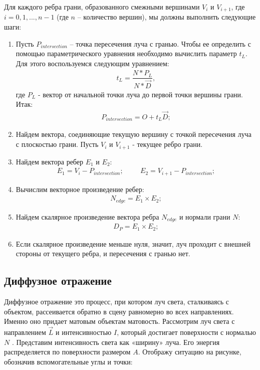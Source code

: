 Для каждого ребра грани, образованного смежными вершинами $V_{i}$ и $V_{i+1}$, где $i = 0, 1, ..., n-1$ (где $n$ – количество вершин), мы должны выполнить следующие шаги:

\begin{enumerate}[label=\arabic*)]
	\item Пусть $P_{intersection}$ – точка пересечения луча с гранью. Чтобы ее определить с помощью параметрического уравнения необходимо вычислить параметр $t_{L}$. Для этого воспользуемся следующим уравнением:
	\begin{gather}
		t_{L} = \dfrac{N*P_L}{N*\vec{D}},
	\end{gather}
	где $P_L$ - вектор от начальной точки луча до первой точки вершины грани. Итак:
	\begin{gather}
		P_{intersection} = O+t_{L}\vec{D};
	\end{gather}
	\item Найдем вектора, соединяющие текущую вершину с точкой пересечения луча с плоскостью грани. Пусть $V_{i}$ и $V_{i+1}$ - текущее ребро грани.
	\item Найдем вектора ребер $E_{1}$ и $E_{2}$:
	\begin{gather}
		E_{1} = V_{i} - P_{intersection}; \hspace{1cm}
		E_{2} = V_{i+1} - P_{intersection};
	\end{gather}
	\item Вычислим векторное произведение ребер:
	\begin{gather}
		N_{edge} = E_{1} \times E_{2};
	\end{gather}
	\item Найдем скалярное произведение вектора ребра $N_{edge}$ и нормали грани $N$:
	\begin{gather}
		D_{P} = E_{1} \times E_{2};
	\end{gather}
	\item Если скалярное произведение меньше нуля, значит, луч проходит с внешней стороны от текущего ребра, и пересечения с гранью нет.
\end{enumerate}

\subsection{Диффузное отражение}

Диффузное отражение это процесс, при котором луч света, сталкиваясь с объектом, рассеивается обратно в сцену равномерно во всех направлениях. Именно оно придает матовым объектам матовость.
Рассмотрим луч света с направлением $\vec{L}$ и интенсивностью $I$, который достигает поверхности с нормалью $N$ . Представим интенсивность света как «ширину» луча. Его энергия распределяется по поверхности размером $A$. Отображу ситуацию на рисунке, обозначив вспомогательные углы и точки:

